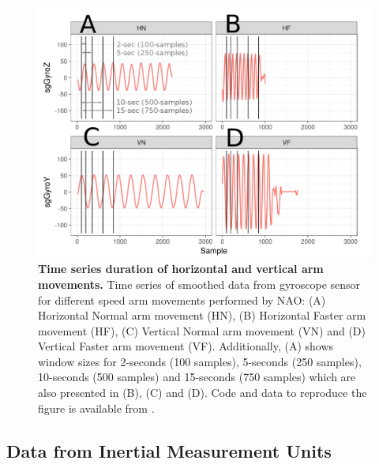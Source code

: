 \documentclass[fleqn,10pt]{wlscirep}
\begin{document}
\begin{figure}[ht] 
\centering
\includegraphics[width=1.0\textwidth]{figures/experiment/sts/pdf/sts}
    \caption{
	{\bf Time series duration of horizontal and vertical arm movements.} 
    		Time series of smoothed data from gyroscope sensor 
		for different speed arm movements performed by NAO: 
		(A) Horizontal Normal arm movement (HN), 
		(B) Horizontal Faster arm movement (HF),
		(C) Vertical Normal arm movement (VN) and 
		(D) Vertical Faster arm movement (VF).
		Additionally, 
		(A) shows window sizes for 2-seconds (100 samples), 
		5-seconds (250 samples), 10-seconds (500 samples) 
		and 15-seconds (750 samples)
		which are also presented in (B), (C) and (D).
		Code and data to reproduce the figure is available from \cite{srep2019}.
        }
	\label{fig:sts}
\end{figure}




\subsection*{Data from Inertial Measurement Units} 
	\label{sec:experiment:subsec:imu}
\end{document}
